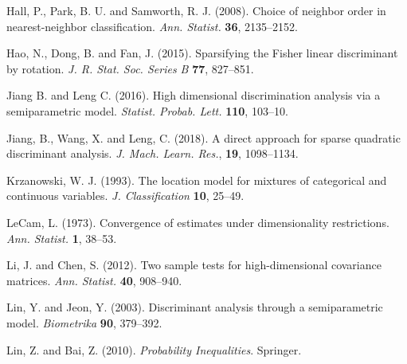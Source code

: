 \documentclass[11pt]{article}
\theoremstyle{definition}
\begin{document}
\begin{thebibliography}{}
 	
 	{Hall, P., Park, B. U.} and {Samworth, R. J.} (2008).
 	{Choice of neighbor order in nearest-neighbor classification.}
 	\textit{Ann. Statist.} {\bf 36}, 2135--2152.
 	
 	{Hao, N.}, {Dong, B.} and {Fan, J.} (2015).
 	Sparsifying the Fisher linear discriminant by rotation.
 	\textit{J. R. Stat. Soc. Series B} {\bf 77}, 827--851.
 	
 	
 	
 	Jiang B. and Leng C. (2016). High dimensional discrimination analysis via a semiparametric model. {\it Statist. Probab. Lett.} {\bf 110}, 103--10.
 	
 	
 	{Jiang, B., Wang, X.} and {Leng, C.} (2018). A direct approach for sparse quadratic discriminant analysis. {\it J. Mach. Learn. Res.}, {\bf 19}, 1098--1134.
 	
 	
 	{Krzanowski, W. J. } (1993).
 	{The location model for mixtures of categorical and continuous variables.}
 	\textit{J. Classification} {\bf 10}, 25--49.
 	
 	{LeCam, L.} (1973). {Convergence of estimates under dimensionality restrictions.}
 	\textit{Ann. Statist.} {\bf 1}, 38--53.
 	
 	
 	
 	{Li, J.} and {Chen, S.} (2012).  {Two sample tests for high-dimensional covariance matrices.}
 	\textit{Ann. Statist.} {\bf 40},
 	908--940.
 	
 	
 	{Lin, Y.} and  {Jeon, Y.} (2003).
 	{Discriminant analysis through a semiparametric model.}
 	\textit{Biometrika} {\bf 90}, 379--392.
 	
 	
 	{Lin, Z.} and {Bai, Z.} (2010).
 	\textit{Probability Inequalities}. Springer.
 	
 	
 	
 	

\end{thebibliography}
\end{document}

